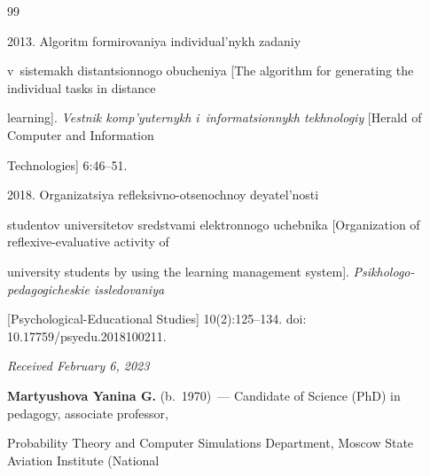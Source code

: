 {{\begin{thebibliography}{99}


 2013. Algoritm formirovaniya individual'nykh zadaniy 


v~sis\-te\-makh distantsionnogo obucheniya [The algorithm for generating the individual tasks in distance 


learning]. \textit{Vestnik komp'yuternykh i~informatsionnykh tekhnologiy} [Herald of Computer and Information 


Technologies] 6:46--51. 




 2018. Organizatsiya refleksivno-otsenochnoy deyatel'nosti 


studentov universitetov sredstvami elektronnogo uchebnika [Organization of reflexive-evaluative activity of 


university students by using the learning management system]. \textit{Psikhologo-pedagogicheskie issledovaniya} 


[Psychological-Educational Studies] 10(2):125--134. doi: 10.17759\!/\!psyedu.2018100211.


\end{thebibliography}


} }





\vspace*{-6pt}





\hfill{\small\textit{Received February 6, 2023}} 





\vspace*{-16pt} 





\Contr





\vspace*{-4pt}





\noindent


\textbf{Martyushova Yanina G.} (b.\ 1970)~--- Candidate of Science (PhD) in pedagogy, associate professor,  


Probability Theory and Computer Simulations Department, Moscow State Aviation Institute (National 


